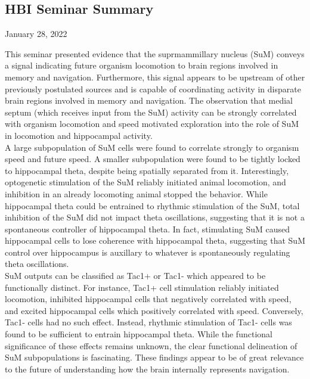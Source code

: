 \documentclass[12pt, letterpaper]{article}
\begin{document}
\begin{center}
    {\section*{\normalfont\normalsize\bf HBI Seminar Summary}}
    {\normalfont\normalsize January 28, 2022}
\end{center}

This seminar presented evidence that the  suprmammillary nucleus (SuM) conveys a signal indicating future organism locomotion to brain regions involved in memory and navigation. Furthermore, this signal appears to be upstream of other previously postulated sources and is capable of coordinating activity in disparate brain regions involved in memory and navigation. The observation that medial septum (which receives input from the SuM) activity can be strongly correlated with organism locomotion and speed motivated exploration into the role of SuM in locomotion and hippocampal activity.\\

A large subpopulation of SuM cells were found to correlate strongly to organism speed and future speed. A smaller subpopulation were found to be tightly locked to hippocampal theta, despite being spatially separated from it. Interestingly, optogenetic stimulation of the SuM reliably initiated animal locomotion, and inhibition in an already locomoting animal stopped the behavior. While hippocampal theta could be entrained to rhythmic stimulation of the SuM, total inhibition of the SuM did not impact theta oscillations, suggesting that it is not a spontaneous controller of hippocampal theta. In fact, stimulating SuM caused hippocampal cells to lose coherence with hippocampal theta, suggesting that SuM control over hippocampus is auxillary to whatever is spontaneously regulating theta oscillations.\\ 

SuM outputs can be classified as Tac1+ or Tac1- which appeared to be functionally distinct. For instance, Tac1+ cell stimulation reliably initiated locomotion, inhibited hippocampal cells that negatively correlated with speed, and excited hippocampal cells which positively correlated with speed. Conversely, Tac1- cells had no such effect. Instead, rhythmic stimulation of Tac1- cells was found to be sufficient to entrain hippocampal theta. While the functional significance of these effects remains unknown, the clear functional delineation of SuM subpopulations is fascinating. These findings appear to be of great relevance to the future of understanding how the brain internally represents navigation.
\end{document}
